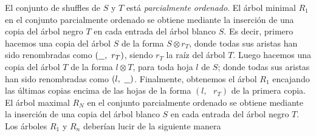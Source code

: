 \documentclass[../main.tex]{subfiles}
\begin{document}
El conjunto de shuffles de $S$ y $T$ est\'a \emph{parcialmente ordenado}. El \'arbol minimal $R_1$ en el conjunto parcialmente ordenado se obtiene mediante la inserci\'on de una copia del \'arbol negro $T$ en cada entrada del \'arbol blanco $S$.
Es decir, primero hacemos una copia del \'arbol $S$ de la forma $S\otimes r_T$, donde todas sus aristas han sido renombradas como $(\underline{\hspace{.25cm}},\text{ }r_T)$, siendo $r_T$ la ra\'iz del \'arbol $T$.
Luego hacemos una copia del \'arbol $T$ de la forma $l\otimes T$, para toda hoja $l$ de $S$; donde todas sus aristas han sido renombradas como $(l,\text{ }\underline{\hspace{.25cm}})$.
Finalmente, obtenemos el \'arbol $R_1$ encajando las \'ultimas copias encima de las hojas de la forma $(l,\text{ }r_T)$ de la primera copia.
El \'arbol maximal $R_N$ en el conjunto parcialmente ordenado se obtiene mediante la inserci\'on de una copia del \'arbol blanco $S$ en cada entrada del \'arbol negro $T$.
Los \'arboles $R_1$ y $R_n$ deber\'ian lucir de la siguiente manera
\end{document}
